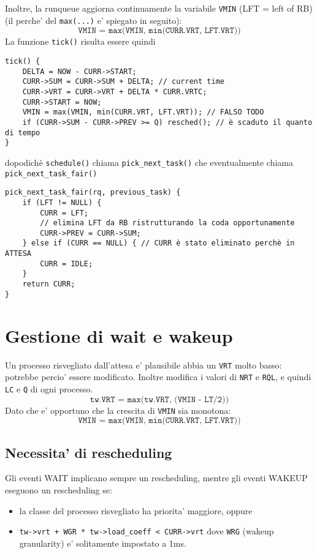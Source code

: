 \documentclass[12pt, a4paper]{report}
\begin{document}
Inoltre, la runqueue aggiorna continuamente la variabile \texttt{VMIN} (LFT =
left of RB) (il perche' del \texttt{max(...)} e' spiegato in seguito):
\[
	\texttt{VMIN = max(VMIN, min(CURR.VRT, LFT.VRT))}
\]
La funzione \texttt{tick()} risulta essere quindi
\begin{verbatim}
tick() {
    DELTA = NOW - CURR->START;
    CURR->SUM = CURR->SUM + DELTA; // current time
    CURR->VRT = CURR->VRT + DELTA * CURR.VRTC;
    CURR->START = NOW;
    VMIN = max(VMIN, min(CURR.VRT, LFT.VRT)); // FALSO TODO
    if (CURR->SUM - CURR->PREV >= Q) resched(); // è scaduto il quanto di tempo
}
\end{verbatim}
dopodichè \texttt{schedule()} chiama \texttt{pick\_next\_task()} che eventualmente
chiama \texttt{pick\_next\_task\_fair()}
\begin{verbatim}
pick_next_task_fair(rq, previous_task) {
    if (LFT != NULL) {
        CURR = LFT;
        // elimina LFT da RB ristrutturando la coda opportunamente
        CURR‐>PREV = CURR‐>SUM;
    } else if (CURR == NULL) { // CURR è stato eliminato perchè in ATTESA
        CURR = IDLE;
    }
    return CURR;
}
\end{verbatim}

\section{Gestione di wait e wakeup}
Un processo risvegliato dall'attesa e' plausibile abbia un \texttt{VRT} molto
basso: potrebbe percio' essere modificato. Inoltre modifica i valori di
\texttt{NRT} e \texttt{RQL}, e quindi \texttt{LC} e \texttt{Q} di ogni processo.
\[
	\texttt{tw.VRT = max(tw.VRT, (VMIN - LT/2))}
\]
Dato che e' opportuno che la crescita di \texttt{VMIN} sia monotona:
\[
	\texttt{VMIN = max(VMIN, min(CURR.VRT, LFT.VRT))}
\]

\subsection{Necessita' di rescheduling}
Gli eventi WAIT implicano sempre un rescheduling, mentre gli eventi WAKEUP
eseguono un rescheduling se:
\begin{itemize}
	\item la classe del processo risvegliato ha priorita' maggiore, oppure
	\item \texttt{tw‐>vrt + WGR * tw‐>load\_coeff < CURR‐>vrt} dove
		\texttt{WRG} (wakeup granularity) e' solitamente impostato a 1ms.
\end{itemize}
\end{document}
